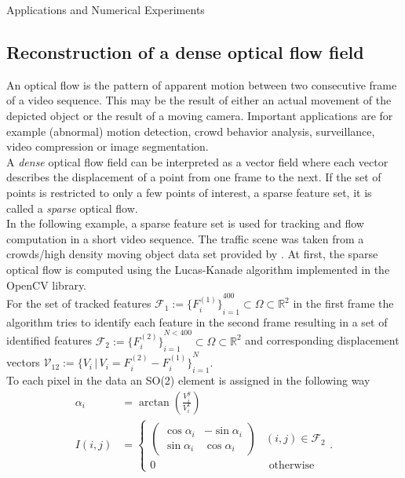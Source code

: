 \begin{chapter}{Applications and Numerical Experiments}
\FloatBarrier
\subsection{Reconstruction of a dense optical flow field} %
\label{sub:reconstructionDenseOpticalFlow}
An optical flow is the pattern of apparent motion between two consecutive frame of a video sequence. This may be the result of either an actual movement of the depicted object
or the result of a moving camera. Important applications are for example (abnormal) motion detection, crowd behavior analysis, surveillance, video compression or image segmentation.\\
A \emph{dense} optical flow field can be interpreted as a vector field where each vector describes the displacement of a point from one frame to the next. If
the set of points is restricted to only a few points of interest, a sparse feature set, it is called a \emph{sparse} optical flow.\\

In the following example, a sparse feature set is used for tracking and flow computation in a short video sequence. The traffic scene was taken from a crowds/high density moving object data 
set provided by \cite{AliShah}. At first, the sparse optical flow is computed using the Lucas-Kanade algorithm \cite{LucasKanade} implemented in the OpenCV library. \\
For the set of tracked features 
$\mathcal{F}_1:=\lbrace{F^{(1)}_i\rbrace}_{i=1}^{400}\subset\Omega\subset\mathbb{R}^2$ in the first frame the algorithm tries to identify each feature in the second frame resulting in a set of
identified features $\mathcal{F}_2:=\lbrace{F^{(2)}_i\rbrace}_{i=1}^{N<400}\subset\Omega\subset\mathbb{R}^2$ and corresponding displacement vectors 
$\mathcal{V}_{12}:=\lbrace{V_i\,|\,V_i=F_i^{(2)}-F_i^{(1)}\rbrace}_{i=1}^{N}$.\\

To each pixel in the data an SO(2) element is assigned in the following way
\begin{align}
    \alpha_i &=\arctan\left(\frac{V^y_i}{V^x_i}\right) \\
    I(i,j) &= 
    \begin{cases}
    	\begin{pmatrix}
	    \cos\alpha_i    & -\sin\alpha_i\\
	    \sin\alpha_i    & \cos\alpha_i
	\end{pmatrix} & (i,j)\in \mathcal{F}_{2} \\
	0 & \text{ otherwise}
    \end{cases}.
\end{align}


\end{chapter}
